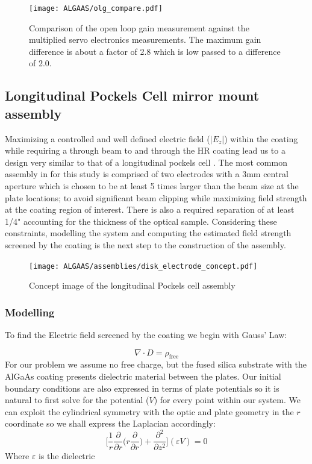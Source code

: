 \begin{figure}[H]
\begin{center}
\texttt{[image: ALGAAS/olg\_compare.pdf]}
\end{center}
\caption{Comparison of the open loop gain measurement against the multiplied servo electronics measurements. The maximum gain difference is about a factor of 2.8 which is low passed to a difference of 2.0.}
\label{fig:OLG_compare}
\end{figure}


\subsection{Longitudinal Pockels Cell mirror mount assembly}
Maximizing a controlled and well defined electric field ($|E_z|$) within the coating while requiring a through beam to and through the HR coating lead us to a design very similar to that of a longitudinal pockels cell \cite{}. The most common assembly in for this study is comprised of two electrodes with a 3mm central aperture which is chosen to be at least 5 times larger than the beam size at the plate locations; to avoid significant beam clipping while maximizing field strength at the coating region of interest. There is also a required separation of at least 1/4" accounting for the thickness of the optical sample. Considering these constraints, modelling the system and computing the estimated field strength screened by the coating is the next step to the construction of the assembly.

\begin{figure}[H]
\begin{center}
\texttt{[image: ALGAAS/assemblies/disk\_electrode\_concept.pdf]}
\end{center}
\caption{Concept image of the longitudinal Pockels cell assembly}
\label{fig:pock_cell_assembly_concept}
\end{figure}

\subsubsection{Modelling}

To find the Electric field screened by the coating we begin with Gauss' Law:

\begin{equation}
\nabla \cdot D = \rho_\mathrm{free}
\end{equation}
For our problem we assume no free charge, but the fused silica substrate with the AlGaAs coating presents dielectric material between the plates. Our initial boundary conditions are also expressed in terms of plate potentials so it is natural to first solve for the potential ($V$) for every point within our system. We can exploit the cylindrical symmetry with the optic and plate geometry in the $r$ coordinate so we shall express the Laplacian accordingly:
\begin{equation}
\bigg[\frac{1}{r}\frac{\partial}{\partial r} \bigg( r \frac{\partial}{\partial r}\bigg) + \frac{\partial^2}{\partial z^2}\bigg](\varepsilon V) = 0
\end{equation}
Where $\varepsilon$ is the dielectric

